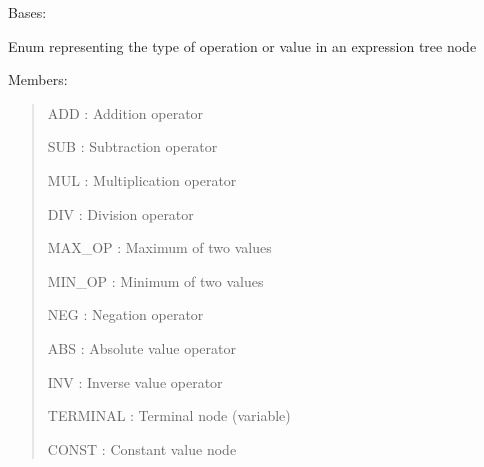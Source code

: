 \documentclass[letterpaper,10pt,english]{sphinxmanual}
\begin{document}

\begin{fulllineitems}
\label{\detokenize{api:scheduler.NodeType}}
\pysigstartsignatures
\pysigline
{}
\pysigstopsignatures
\sphinxAtStartPar
Bases: 

\sphinxAtStartPar
Enum representing the type of operation or value in an expression tree node

\sphinxAtStartPar
Members:
\begin{quote}

\sphinxAtStartPar
ADD : Addition operator

\sphinxAtStartPar
SUB : Subtraction operator

\sphinxAtStartPar
MUL : Multiplication operator

\sphinxAtStartPar
DIV : Division operator

\sphinxAtStartPar
MAX\_OP : Maximum of two values

\sphinxAtStartPar
MIN\_OP : Minimum of two values

\sphinxAtStartPar
NEG : Negation operator

\sphinxAtStartPar
ABS : Absolute value operator

\sphinxAtStartPar
INV : Inverse value operator

\sphinxAtStartPar
TERMINAL : Terminal node (variable)

\sphinxAtStartPar
CONST : Constant value node
\end{quote}

\begin{fulllineitems}
\label{\detokenize{api:scheduler.NodeType.ABS}}
\pysigstartsignatures
\pysigline
{}
\pysigstopsignatures
\end{fulllineitems}


\begin{fulllineitems}
\label{\detokenize{api:scheduler.NodeType.ADD}}
\pysigstartsignatures
\pysigline
{}
\pysigstopsignatures
\end{fulllineitems}


\end{fulllineitems}
\end{document}
